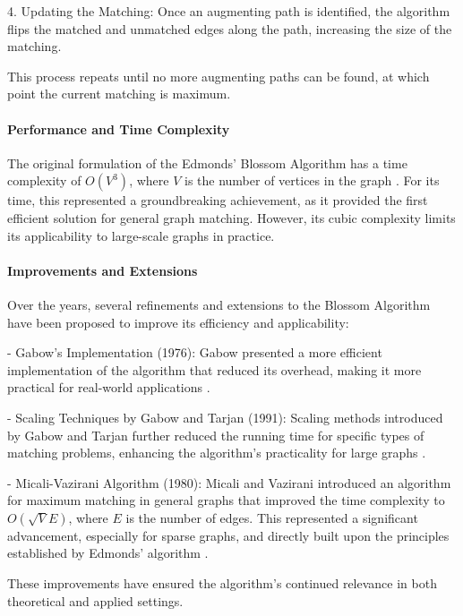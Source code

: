 4. Updating the Matching:
   Once an augmenting path is identified, the algorithm flips the matched and unmatched edges along the path, increasing the size of the matching.

This process repeats until no more augmenting paths can be found, at which point the current matching is maximum.

\paragraph{Performance and Time Complexity}
The original formulation of the Edmonds' Blossom Algorithm has a time complexity of \(O(V^3)\), where \(V\) is the number of vertices in the graph \cite{edmonds1965paths}. For its time, this represented a groundbreaking achievement, as it provided the first efficient solution for general graph matching. However, its cubic complexity limits its applicability to large-scale graphs in practice.

\paragraph{Improvements and Extensions}
Over the years, several refinements and extensions to the Blossom Algorithm have been proposed to improve its efficiency and applicability:

- Gabow’s Implementation (1976):
   Gabow presented a more efficient implementation of the algorithm that reduced its overhead, making it more practical for real-world applications \cite{gabow1976efficient}.
   
- Scaling Techniques by Gabow and Tarjan (1991):
   Scaling methods introduced by Gabow and Tarjan further reduced the running time for specific types of matching problems, enhancing the algorithm's practicality for large graphs \cite{gabow1991faster}.

- Micali-Vazirani Algorithm (1980):
   Micali and Vazirani introduced an algorithm for maximum matching in general graphs that improved the time complexity to \(O(\sqrt{V}E)\), where \(E\) is the number of edges. This represented a significant advancement, especially for sparse graphs, and directly built upon the principles established by Edmonds' algorithm \cite{micali1980proof}.

These improvements have ensured the algorithm's continued relevance in both theoretical and applied settings.

